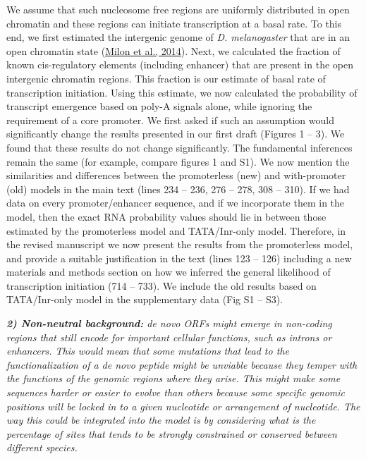 \documentclass[12pt,a4paper]{article}
\begin{document}
We assume that such nucleosome free regions are uniformly distributed in open chromatin and these regions can initiate transcription at a basal rate. To this end, we first estimated the intergenic genome of \textit{D. melanogaster} that are in an open chromatin state (\href{https://doi.org/10.1186/1471-2164-15-988}{Milon et al., 2014}). Next, we calculated the fraction of known cis-regulatory elements (including enhancer) that are present in the open intergenic chromatin regions. This fraction is our estimate of basal rate of transcription initiation. Using this estimate, we now calculated the probability of transcript emergence based on poly-A signals alone, while ignoring the requirement of a core promoter. We first asked if such an assumption would significantly change the results presented in our first draft (Figures 1 -- 3). We found that these results do not change significantly. The fundamental inferences remain the same (for example, compare figures 1 and S1). We now mention the similarities and differences between the promoterless (new) and with-promoter (old) models in the main text (lines 234 -- 236, 276 -- 278, 308 -- 310). If we had data on every promoter/enhancer sequence, and if we incorporate them in the model, then the exact RNA probability values should lie in between those estimated by the promoterless model and TATA/Inr-only model. Therefore, in the revised manuscript we now present the results from the promoterless model, and provide a suitable justification in the text (lines 123 -- 126) including a new materials and methods section on how we inferred the general likelihood of transcription initiation (714 -- 733). We include the old results based on TATA/Inr-only model in the supplementary data (Fig S1 -- S3). 

{\itshape \textbf{2) Non-neutral background:} de novo ORFs might emerge in non-coding regions that still encode for important cellular functions, such as introns or enhancers. This would mean that some mutations that lead to the functionalization of a de novo peptide might be unviable because they temper with the functions of the genomic regions where they arise. This might make some sequences harder or easier to evolve than others because some specific genomic positions will be locked in to a given nucleotide or arrangement of nucleotide. The way this could be integrated into the model is by considering what is the percentage of sites that tends to be strongly constrained or conserved between different species.}
\end{document}
